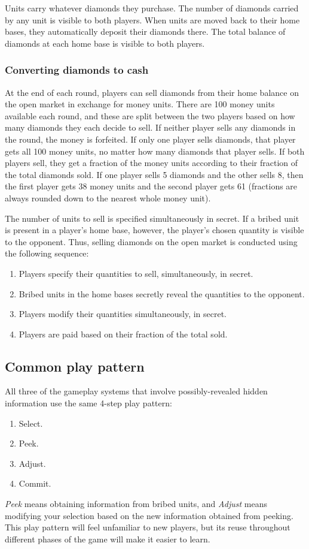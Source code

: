 \documentclass[12pt]{article}
\begin{document}
Units carry whatever diamonds they purchase.  The number of diamonds carried by any unit is visible to both players.  When units are moved back to their home bases, they automatically deposit their diamonds there.  The total balance of diamonds at each home base is visible to both players.


\subsubsection{Converting diamonds to cash}
At the end of each round, players can sell diamonds from their home balance on the open market in exchange for money units.  There are 100 money units available each round, and these are split between the two players based on how many diamonds they each decide to sell.  If neither player sells any diamonds in the round, the money is forfeited.  If only one player sells diamonds, that player gets all 100 money units, no matter how many diamonds that player sells.  If both players sell, they get a fraction of the money units according to their fraction of the total diamonds sold.  If one player sells 5 diamonds and the other sells 8, then the first player gets 38 money units and the second player gets 61 (fractions are always rounded down to the nearest whole money unit).  

The number of units to sell is specified simultaneously in secret.  If a bribed unit is present in a player's home base, however, the player's chosen quantity is visible to the opponent.  Thus, selling diamonds on the open market is conducted using the following sequence: 
\begin{enumerate}
\item Players specify their quantities to sell, simultaneously, in secret.
\item Bribed units in the home bases secretly reveal the quantities to the opponent.
\item Players modify their quantities simultaneously, in secret.
\item Players are paid based on their fraction of the total sold.
\end{enumerate}

\subsection{Common play pattern}
All three of the gameplay systems that involve possibly-revealed hidden information use the same 4-step play pattern:
\begin{enumerate}
\item Select.
\item Peek.
\item Adjust.
\item Commit.
\end{enumerate}
{\it Peek} means obtaining information from bribed units, and {\it Adjust} means modifying your selection based on the new information obtained from peeking.  This play pattern will feel unfamiliar to new players, but its reuse throughout different phases of the game will make it easier to learn.
\end{document}
